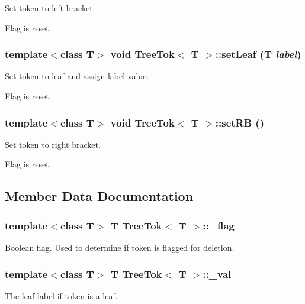 Set token to left bracket. 

Flag is reset. 
\subsubsection{\setlength{\rightskip}{0pt plus 5cm}template$<$class T$>$ void {\bf Tree\-Tok}$<$ T $>$::set\-Leaf (T {\em label})\hspace{0.3cm}{\tt  [inline]}}\label{structTreeTok_a5}


Set token to leaf and assign label value. 

Flag is reset. 
\subsubsection{\setlength{\rightskip}{0pt plus 5cm}template$<$class T$>$ void {\bf Tree\-Tok}$<$ T $>$::set\-RB ()\hspace{0.3cm}{\tt  [inline]}}\label{structTreeTok_a4}


Set token to right bracket. 

Flag is reset. 

\subsection{Member Data Documentation}
\subsubsection{\setlength{\rightskip}{0pt plus 5cm}template$<$class T$>$ T {\bf Tree\-Tok}$<$ T $>$::{\bf \_\-flag}}\label{structTreeTok_o1}


Boolean flag. Used to determine if token is flagged for deletion. 

\subsubsection{\setlength{\rightskip}{0pt plus 5cm}template$<$class T$>$ T {\bf Tree\-Tok}$<$ T $>$::{\bf \_\-val}}\label{structTreeTok_o0}


The leaf label if token is a leaf. 


